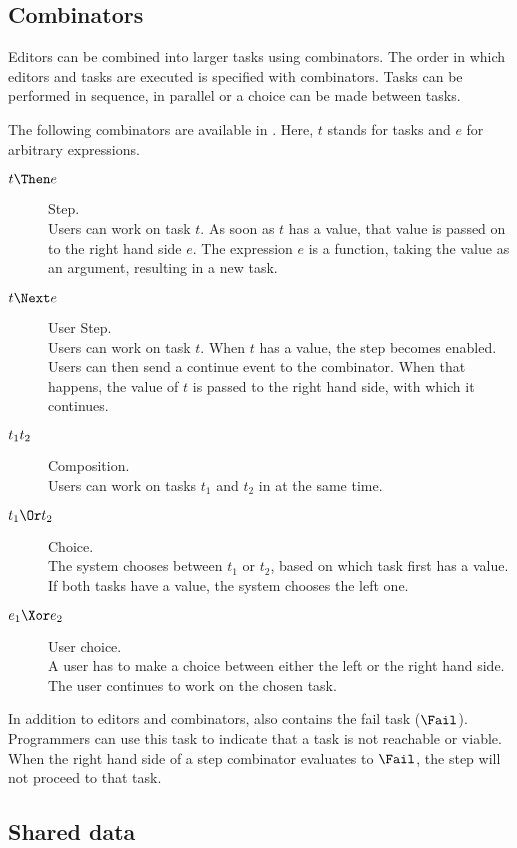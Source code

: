 \subsection{Combinators}

Editors can be combined into larger tasks using combinators.
The order in which editors and tasks are executed is specified with combinators. Tasks can be performed in sequence, in parallel or a choice can be made between tasks.


The following combinators are available in \TOPHAT.
Here, $t$ stands for tasks and $e$ for arbitrary expressions.
\begin{description}
  \item[$t \Then e$] Step.\\
    Users can work on task $t$.
    As soon as $t$ has a value, that value is passed on to the right hand side $e$.
    The expression $e$ is a function, taking the value as an argument, resulting in a new task.
  \item[$t \Next e$] User Step.\\
    Users can work on task $t$.
    When $t$ has a value, the step becomes enabled.
    Users can then send a continue event to the combinator.
    When that happens, the value of $t$ is passed to the right hand side, with which it continues.
  \item[$t_1 \relax t_2$] Composition.\\
    Users can work on tasks $t_1$ and $t_2$ in at the same time.
  \item[$t_1 \Or t_2$] Choice.\\
    The system chooses between $t_1$ or $t_2$,
    based on which task first has a value.
    If both tasks have a value, the system chooses the left one.
  \item[$e_1 \Xor e_2$] User choice.\\
    A user has to make a choice between either the left or the right hand side.
    The user continues to work on the chosen task.
\end{description}

In addition to editors and combinators, \TOPHAT also contains the fail task ($\Fail$).
Programmers can use this task to indicate that a task is not reachable or viable.
When the right hand side of a step combinator evaluates to $\Fail$, the step will not proceed to that task.



\subsection{Shared data}

